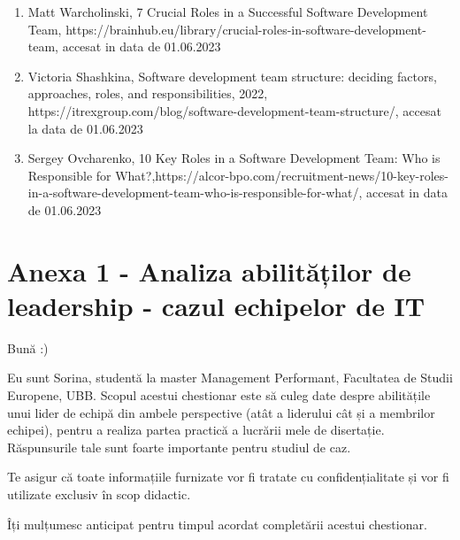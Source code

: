 \documentclass[a4paper, 12pt]{article}
\begin{document}
\begin{enumerate}[1.]
	\item Matt Warcholinski, 7 Crucial Roles in a Successful Software Development Team, https://brainhub.eu/library/crucial-roles-in-software-development-team, accesat in data de 01.06.2023

	\item Victoria Shashkina, Software development team structure: deciding factors, approaches, roles, and responsibilities, 2022, https://itrexgroup.com/blog/software-development-team-structure/, accesat la data de 01.06.2023

	\item Sergey Ovcharenko, 10 Key Roles in a Software Development Team: Who is Responsible for What?,https://alcor-bpo.com/recruitment-news/10-key-roles-in-a-software-development-team-who-is-responsible-for-what/, accesat in data de 01.06.2023

	\end{enumerate}



\newpage
	\section*{Anexa 1 - Analiza abilităților de leadership - cazul echipelor de IT }	

	\thispagestyle{empty}
	 
	\qquad\space Bună :)

      \quad Eu sunt Sorina, studentă la master Management Performant, Facultatea de Studii Europene, UBB. Scopul acestui chestionar este să culeg date despre abilitățile unui lider de echipă din ambele perspective (atât a liderului cât și a membrilor echipei), pentru a realiza partea practică a lucrării mele de disertație. Răspunsurile tale sunt foarte importante pentru studiul de caz.

	\quad Te asigur că toate informațiile furnizate vor fi tratate cu confidențialitate și vor fi utilizate exclusiv în scop didactic.

	\quad Îți mulțumesc anticipat pentru timpul acordat completării acestui chestionar.
	\newline
\end{document}
